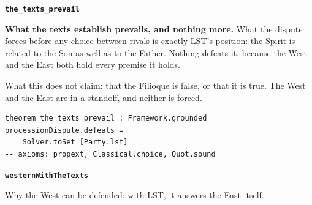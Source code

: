 \documentclass[11pt,paper=\testimonypaper,DIV=13,parskip=false]{scrartcl}
\begin{document}
\par\medskip\noindent\textbf{\texttt{the\_\allowbreak{}texts\_\allowbreak{}prevail}}\par\nobreak\noindent
\textbf{What the texts establish prevails, and nothing more.} What the dispute forces before any choice between rivals is exactly LST’s position: the Spirit is related to the Son as well as to the Father. Nothing defeats it, because the West and the East both hold every premise it holds.

What this does not claim: that the Filioque is false, or that it is true. The West and the East are in a standoff, and neither is forced.

{\small\begin{verbatim}
theorem the_texts_prevail : Framework.grounded processionDispute.defeats =
    Solver.toSet [Party.lst]
-- axioms: propext, Classical.choice, Quot.sound
\end{verbatim}}
\par\medskip\noindent\textbf{\texttt{western\allowbreak{}With\allowbreak{}The\allowbreak{}Texts}}\par\nobreak\noindent
Why the West can be defended: with LST, it answers the East itself.
\end{document}
